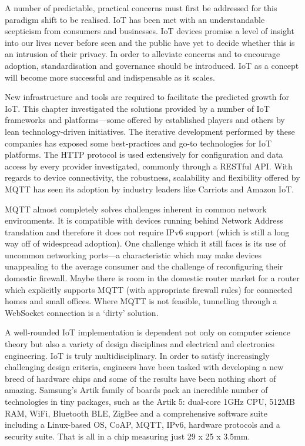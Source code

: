     A number of predictable, practical concerns must first be addressed for this paradigm shift to be realised. IoT has been met with an understandable scepticism from consumers and businesses. IoT devices promise a level of insight into our lives never before seen and the public have yet to decide whether this is an intrusion of their privacy. In order to alleviate concerns and to encourage adoption, standardisation and governance should be introduced. IoT as a concept will become more successful and indispensable as it scales.

    New infrastructure and tools are required to facilitate the predicted growth for IoT. This chapter investigated the solutions provided by a number of IoT frameworks and platforms---some offered by established players and others by lean technology-driven initiatives. The iterative development performed by these companies has exposed some best-practices and go-to technologies for IoT platforms. The HTTP protocol is used extensively for configuration and data access by every provider investigated, commonly through a RESTful API. With regards to device connectivity, the robustness, scalability and flexibility offered by MQTT has seen its adoption by industry leaders like Carriots and Amazon IoT.

    MQTT almost completely solves challenges inherent in common network environments. It is compatible with devices running behind Network Address translation and therefore it does not require IPv6 support (which is still a long way off of widespread adoption). One challenge which it still faces is its use of uncommon networking ports---a characteristic which may make devices unappealing to the average consumer and the challenge of reconfiguring their domestic firewall. Maybe there is room in the domestic router market for a router which explicitly supports MQTT (with appropriate firewall rules) for connected homes and small offices. Where MQTT is not feasible, tunnelling through a WebSocket connection is a `dirty' solution.

    A well-rounded IoT implementation is dependent not only on computer science theory but also a variety of design disciplines and electrical and electronics engineering. IoT is truly multidisciplinary. In order to satisfy increasingly challenging design criteria, engineers have been tasked with developing a new breed of hardware chips and some of the results have been nothing short of amazing. Samsung's Artik family of boards pack an incredible number of technologies in tiny packages, such as the Artik 5: dual-core 1GHz CPU, 512MB RAM, WiFi, Bluetooth BLE, ZigBee and a comprehensive software suite including a Linux-based OS, CoAP, MQTT, IPv6, hardware protocols and a security suite. That is all in a chip measuring just 29 x 25 x 3.5mm.

